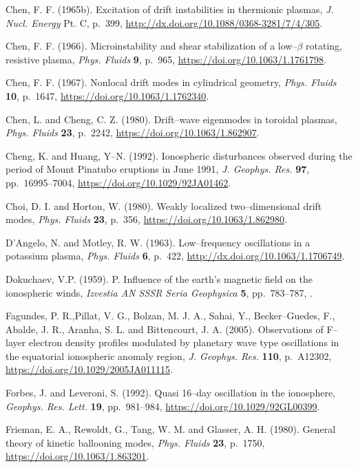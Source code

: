 \documentclass[a4paper,openany,12pt]{book}
\begin{document}
\begin{thebibliography}{100}
\bibitem{}
Chen, F. F. (1965b). Excitation of drift instabilities in thermionic plasmas, \emph{J. Nucl. Energy} Pt. C, 
p.~399, \url{http://dx.doi.org/10.1088/0368-3281/7/4/305}.

\bibitem{}
Chen, F. F. (1966). Microinstability and shear stabilization of a low--$\beta$ rotating, resistive plasma, {\it Phys. Fluids} \textbf{9}, p.~965, \url{https://doi.org/10.1063/1.1761798}.

\bibitem{}
Chen, F. F. (1967). Nonlocal drift modes in cylindrical geometry, {\it Phys. Fluids} \textbf{10}, p.~1647, \url{https://doi.org/10.1063/1.1762340}.

\bibitem{}
Chen, L. and Cheng, C. Z. (1980). Drift--wave eigenmodes in toroidal plasmas, \emph{Phys. Fluids} \textbf{23}, p.~2242, \url{https://doi.org/10.1063/1.862907}.

\bibitem{}
Cheng, K.  and Huang, Y--N. (1992). Ionospheric disturbances observed during the period of Mount Pinatubo eruptions in June 1991, \emph{J. Geophys. Res.} \textbf{97}, pp.~16995--7004,
\url{https://doi.org/10.1029/92JA01462}.

\bibitem{}
Choi, D. I. and Horton, W. (1980). Weakly localized two--dimensional drift modes, \emph{Phys. Fluids} \textbf{23}, p.~356, \url{https://doi.org/10.1063/1.862980}.

\bibitem{}
D'Angelo, N. and Motley, R. W. (1963). Low--frequency oscillations in a potassium plasma, \emph{Phys. Fluids} 
\textbf{6}, p.~422, \url{http://dx.doi.org/10.1063/1.1706749}. 

\bibitem{}
Dokuchaev, V.P. (1959). P. Influence of the earth's magnetic field on the ionospheric winds, \emph{Izvestia  AN SSSR Seria Geophysica} \textbf{5}, pp.~783--787, \url{}.

\bibitem{}
 Fagundes, P. R.,Pillat, V. G., Bolzan, M. J. A., Sahai, Y., Becker--Guedes, F., Abalde, J. R., Aranha, S. L. and Bittencourt, J. A. (2005). Observations of F--layer electron density profiles modulated by planetary wave type oscillations in the equatorial ionospheric anomaly region, \emph{J. Geophys. Res.} \textbf{110}, p.~A12302, \url{https://doi.org/10.1029/2005JA011115}.

\bibitem{}
Forbes, J. and Leveroni, S. (1992). Quasi 16--day oscillation in the ionosphere, {\it Geophys. Res. Lett.} \textbf{19}, pp.~981--984, \url{https://doi.org/10.1029/92GL00399}.

\bibitem{}
Frieman, E. A., Rewoldt, G., Tang, W. M. and Glasser, A. H. (1980). General theory of kinetic ballooning modes, \emph{Phys. Fluids} \textbf{23}, p.~1750, \url{https://doi.org/10.1063/1.863201}.


\end{thebibliography}
\end{document}
